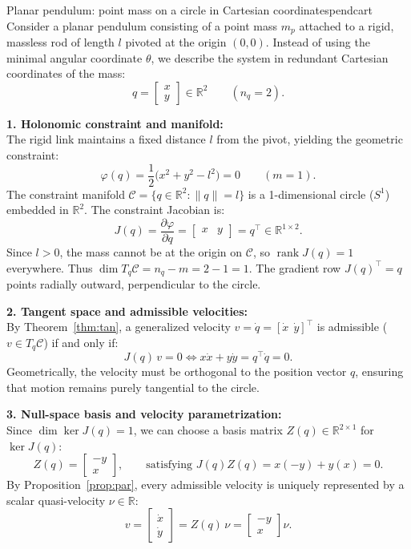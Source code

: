 \documentclass[11pt,a4paper]{article}
\newcommand{\R}{\mathbb{R}}
\DeclareMathOperator{\rank}{rank}
\begin{document}
\begin{example}{Planar pendulum: point mass on a circle in Cartesian coordinates}{pendcart}
Consider a planar pendulum consisting of a point mass $m_p$ attached to a rigid, massless rod of length $l$ pivoted at the origin $(0,0)$. Instead of using the minimal angular coordinate $\theta$, we describe the system in redundant Cartesian coordinates of the mass:
\[
  q = \begin{bmatrix} x \\ y \end{bmatrix} \in \R^2 \qquad (n_q = 2).
\]

\textbf{1. Holonomic constraint and manifold:}\\
The rigid link maintains a fixed distance $l$ from the pivot, yielding the geometric constraint:
\[
  \varphi(q) = \frac{1}{2}\big(x^2 + y^2 - l^2\big) = 0 \qquad (m = 1).
\]
The constraint manifold $\mathcal C = \{q \in \R^2 : \|q\| = l\}$ is a 1-dimensional circle ($S^1$) embedded in $\R^2$. The constraint Jacobian is:
\[
  J(q) = \frac{\partial \varphi}{\partial q} = \begin{bmatrix} x & y \end{bmatrix} = q^\top \in \R^{1 \times 2}.
\]
Since $l > 0$, the mass cannot be at the origin on $\mathcal C$, so $\rank J(q) = 1$ everywhere. Thus $\dim T_q\mathcal C = n_q - m = 2 - 1 = 1$. The gradient row $J(q)^\top = q$ points radially outward, perpendicular to the circle.

\smallskip
\textbf{2. Tangent space and admissible velocities:}\\
By Theorem~\ref{thm:tan}, a generalized velocity $v = \dot q = [\dot x\ \ \dot y]^\top$ is admissible ($v \in T_q\mathcal C$) if and only if:
\[
  J(q)\,v = 0 \iff x\dot x + y\dot y = q^\top \dot q = 0.
\]
Geometrically, the velocity must be orthogonal to the position vector $q$, ensuring that motion remains purely tangential to the circle.

\smallskip
\textbf{3. Null-space basis and velocity parametrization:}\\
Since $\dim\ker J(q) = 1$, we can choose a basis matrix $Z(q) \in \R^{2 \times 1}$ for $\ker J(q)$:
\[
  Z(q) = \begin{bmatrix} -y \\ x \end{bmatrix}, \qquad \text{satisfying } J(q)Z(q) = x(-y) + y(x) = 0.
\]
By Proposition~\ref{prop:par}, every admissible velocity is uniquely represented by a scalar quasi-velocity $\nu \in \R$:
\[
  v = \begin{bmatrix} \dot x \\ \dot y \end{bmatrix} = Z(q)\,\nu = \begin{bmatrix} -y \\ x \end{bmatrix}\nu.
\]


\end{example}
\end{document}

